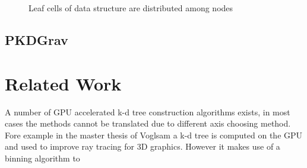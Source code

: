 \documentclass[]{article}
\begin{document}
\begin{enumerate}
\begin{figure}[H]
\begin{center}
\begin{minipage}[c]{0.2\linewidth}
\begin{tikzpicture}
				\end{tikzpicture}
			\end{minipage}
			\begin{minipage}[c]{0.2\linewidth}
			\end{minipage}	
			\begin{minipage}[c]{0.2\linewidth}
			\end{minipage}
		\end{center}
		\caption{Leaf cells of data structure are distributed among nodes}
	\end{figure}
\end{enumerate}


\subsection{PKDGrav}


\newpage
\section{Related Work}

A number of GPU accelerated k-d tree construction algorithms exists, in most cases the methods cannot be translated due to different axis choosing method. Fore example in the master thesis of Voglsam \cite{rrt} a k-d tree is computed on the GPU and used to improve ray tracing for 3D graphics. However it makes use of a binning algorithm to 
\end{document}
